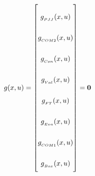 
\begin{equation} \label{eq:Gtotal}\renewcommand{\arraystretch}{2.5}
	g(x,u) =  \begin{bmatrix}
		g_{_{PJJ}}(x,u)  \\ %
		g_{_{COM2}}(x,u) \\ %
		g_{_{Con}}(x,u)  \\ %
		g_{_{Val}}(x,u)  \\ %
		g_{_{FT}}(x,u)   \\ %
		g_{_{Eva}}(x,u)  \\ %
		g_{_{COM1}}(x,u) \\
		g_{_{Box}}(x,u)
	\end{bmatrix}
	= \textbf{0}
\end{equation}



%

